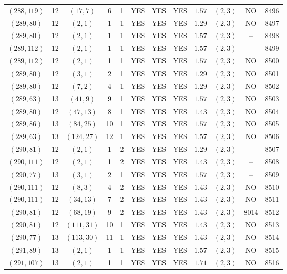 \begin{longtable}{|c|c|c|c|c|c|c|c|c|c|c|c|}
$(288,119)$ & 12 & $(17,7)$ & 6 & 1 & YES & YES & YES & $1.57$ & $(2,3)$ & NO & 8496\\
$(289,80)$ & 12 & $(2,1)$ & 1 & 1 & YES & YES & YES & $1.29$ & $(2,3)$ & NO & 8497\\
$(289,80)$ & 12 & $(2,1)$ & 1 & 1 & YES & YES & YES & $1.57$ & $(2,3)$ & -- & 8498\\
$(289,112)$ & 12 & $(2,1)$ & 1 & 1 & YES & YES & YES & $1.57$ & $(2,3)$ & -- & 8499\\
$(289,112)$ & 12 & $(2,1)$ & 1 & 1 & YES & YES & YES & $1.57$ & $(2,3)$ & NO & 8500\\
$(289,80)$ & 12 & $(3,1)$ & 2 & 1 & YES & YES & YES & $1.29$ & $(2,3)$ & NO & 8501\\
$(289,80)$ & 12 & $(7,2)$ & 4 & 1 & YES & YES & YES & $1.29$ & $(2,3)$ & NO & 8502\\
$(289,63)$ & 13 & $(41,9)$ & 9 & 1 & YES & YES & YES & $1.57$ & $(2,3)$ & NO & 8503\\
$(289,80)$ & 12 & $(47,13)$ & 8 & 1 & YES & YES & YES & $1.43$ & $(2,3)$ & NO & 8504\\
$(289,86)$ & 13 & $(84,25)$ & 10 & 1 & YES & YES & YES & $1.57$ & $(2,3)$ & NO & 8505\\
$(289,63)$ & 13 & $(124,27)$ & 12 & 1 & YES & YES & YES & $1.57$ & $(2,3)$ & NO & 8506\\
$(290,81)$ & 12 & $(2,1)$ & 1 & 2 & YES & YES & YES & $1.29$ & $(2,3)$ & -- & 8507\\
$(290,111)$ & 12 & $(2,1)$ & 1 & 2 & YES & YES & YES & $1.43$ & $(2,3)$ & -- & 8508\\
$(290,77)$ & 13 & $(3,1)$ & 2 & 1 & YES & YES & YES & $1.57$ & $(2,3)$ & -- & 8509\\
$(290,111)$ & 12 & $(8,3)$ & 4 & 2 & YES & YES & YES & $1.43$ & $(2,3)$ & NO & 8510\\
$(290,111)$ & 12 & $(34,13)$ & 7 & 2 & YES & YES & YES & $1.43$ & $(2,3)$ & NO & 8511\\
$(290,81)$ & 12 & $(68,19)$ & 9 & 2 & YES & YES & YES & $1.43$ & $(2,3)$ & 8014 & 8512\\
$(290,81)$ & 12 & $(111,31)$ & 10 & 1 & YES & YES & YES & $1.43$ & $(2,3)$ & NO & 8513\\
$(290,77)$ & 13 & $(113,30)$ & 11 & 1 & YES & YES & YES & $1.43$ & $(2,3)$ & NO & 8514\\
$(291,89)$ & 13 & $(2,1)$ & 1 & 1 & YES & YES & YES & $1.57$ & $(2,3)$ & NO & 8515\\
$(291,107)$ & 13 & $(2,1)$ & 1 & 1 & YES & YES & YES & $1.71$ & $(2,3)$ & NO & 8516\\

\end{longtable}
